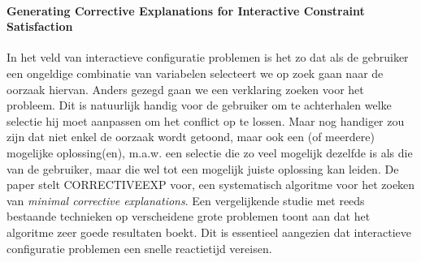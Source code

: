 \paragraph{Generating Corrective Explanations for Interactive Constraint Satisfaction \cite{ocallaghan05}}
In het veld van interactieve configuratie problemen is het zo dat als de gebruiker een ongeldige combinatie van variabelen selecteert we op zoek gaan naar de oorzaak hiervan. Anders gezegd gaan we een verklaring zoeken voor het probleem. Dit is natuurlijk handig voor de gebruiker om te achterhalen welke selectie hij moet aanpassen om het conflict op te lossen. Maar nog handiger zou zijn dat niet enkel de oorzaak wordt getoond, maar ook een (of meerdere) mogelijke oplossing(en), m.a.w. een selectie die zo veel mogelijk dezelfde is als die van de gebruiker, maar die wel tot een mogelijk juiste oplossing kan leiden. De paper stelt CORRECTIVEEXP voor, een systematisch algoritme voor het zoeken van \emph{minimal corrective explanations}. Een vergelijkende studie met reeds bestaande technieken op verscheidene grote problemen toont aan dat het algoritme zeer goede resultaten boekt. Dit is essentieel aangezien dat interactieve configuratie problemen een snelle reactietijd vereisen.
